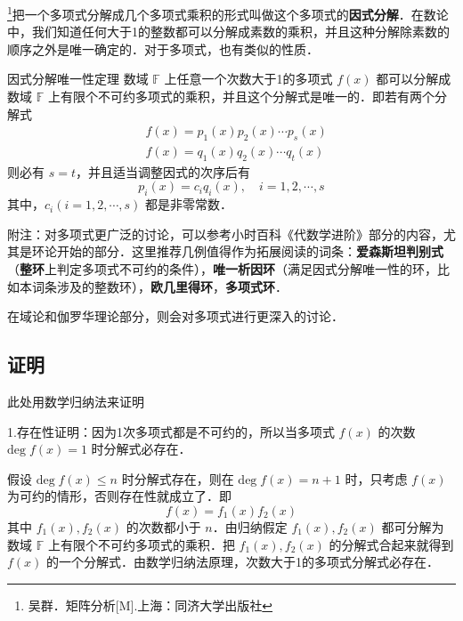 
\footnote{吴群．矩阵分析[M].上海：同济大学出版社}把一个多项式分解成几个多项式乘积的形式叫做这个多项式的\textbf{因式分解}．在数论中，我们知道任何大于1的整数都可以分解成素数的乘积，并且这种分解除素数的顺序之外是唯一确定的．对于多项式，也有类似的性质．
\begin{theorem}{因式分解唯一性定理}
数域 $\mathbb{F}$ 上任意一个次数大于1的多项式 $f(x)$ 都可以分解成数域 $\mathbb{F}$ 上有限个不可约多项式的乘积，并且这个分解式是唯一的．即若有两个分解式
 \begin{equation}
 \begin{aligned}
 &f(x)=p_1(x)p_2(x)\cdots p_s(x)\\
 &f(x)=q_1(x)q_2(x)\cdots q_t(x)
 \end{aligned}
 \end{equation}
 则必有 $s=t$，并且适当调整因式的次序后有
 \begin{equation}
 p_i(x)=c_iq_i(x),\quad i=1,2,\cdots,s
 \end{equation}
 其中，$c_i(i=1,2,\cdots,s)$ 都是非零常数．
\end{theorem}


附注：对多项式更广泛的讨论，可以参考小时百科《代数学进阶》部分的内容，尤其是环论开始的部分．这里推荐几例值得作为拓展阅读的词条：\textbf{爱森斯坦判别式}（\textbf{整环}上判定多项式不可约的条件），\textbf{唯一析因环}（满足因式分解唯一性的环，比如本词条涉及的整数环），\textbf{欧几里得环}，\textbf{多项式环}．

在域论和伽罗华理论部分，则会对多项式进行更深入的讨论．


\subsection{证明}此处用数学归纳法来证明

1.存在性证明：因为1次多项式都是不可约的，所以当多项式 $f(x)$ 的次数 $\mathrm{deg}\;f(x)=1$ 时分解式必存在．

假设 $\mathrm{deg}\;f(x)\leq n$ 时分解式存在，则在 $\mathrm{deg}\;f(x)=n+1$ 时，只考虑 $f(x)$ 为可约的情形，否则存在性就成立了．即
\begin{equation}
f(x)=f_1(x)f_2(x)
\end{equation}
其中 $f_1(x),f_2(x)$ 的次数都小于 $n$．由归纳假定 $f_1(x),f_2(x)$ 都可分解为数域 $\mathbb{F}$ 上有限个不可约多项式的乘积．把 $f_1(x),f_2(x)$ 的分解式合起来就得到 $f(x)$ 的一个分解式．由数学归纳法原理，次数大于1的多项式分解式必存在．

